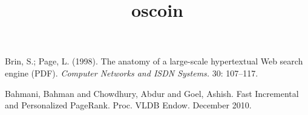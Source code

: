 \documentclass[10pt]{amsart}
\begin{document}
\title{oscoin}

\maketitle



\begin{thebibliography}{9}

 Brin, S.; Page, L. (1998). The anatomy of a
  large-scale hypertextual Web search engine (PDF). \emph{Computer Networks
  and ISDN Systems.} 30: 107–117.

 Bahmani, Bahman and Chowdhury, Abdur and Goel,
  Ashish. Fast Incremental and Personalized PageRank. Proc. VLDB
  Endow. December 2010.
  
\end{thebibliography}
\end{document}
